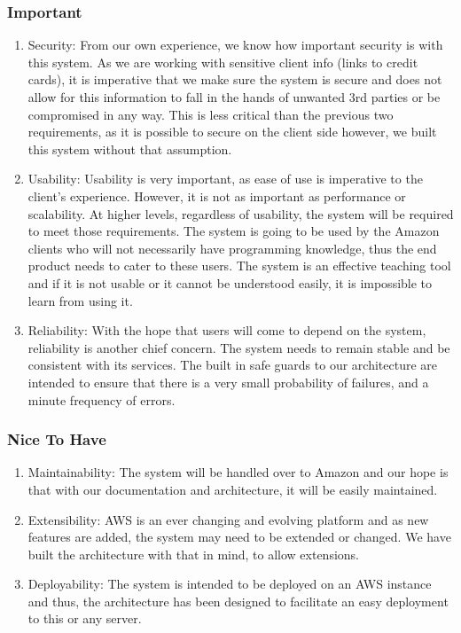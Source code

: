 \documentclass[hidelinks,a4paper,12pt]{article}
\begin{document}
\subsubsection {Important}
\begin{enumerate} 
\item Security: From our own experience, we know how important security is with this system. As we are working with sensitive client info (links to credit cards), it is imperative that we make sure the system is secure and does not allow for this information to fall in the hands of unwanted 3rd parties or be compromised in any way. This is less critical than the previous two requirements, as it is possible to secure on the client side however, we built this system without that assumption. 
\item Usability: Usability is very important, as ease of use is imperative to the client's experience. However, it is not as important as performance or scalability. At higher levels, regardless of usability, the system will be required to meet those requirements. The system is going to be used by the Amazon clients who will not necessarily have programming knowledge, thus the end product needs to cater to these users. The system is an effective teaching tool and if it is not usable or it cannot be understood easily, it is impossible to learn from using it.

\newpage

\item Reliability: With the hope that users will come to depend on the system, reliability is another chief concern. The system needs to remain stable and be consistent with its services. The built in safe guards to our architecture are intended to ensure that there is a very small probability of failures, and a minute frequency of errors.
\end{enumerate} 

\subsubsection {Nice To Have}
\begin{enumerate} 
\item Maintainability: The system will be handled over to Amazon and our hope is that with our documentation and architecture, it will be easily maintained. 
\item Extensibility: AWS is an ever changing and evolving platform and as new features are added, the system may need to be extended or changed. We have built the architecture with that in mind, to allow extensions.
\item Deployability: The system is intended to be deployed on an AWS instance and thus, the architecture has been designed to facilitate an easy deployment to this or any server.
\end{enumerate} 
\end{document}
